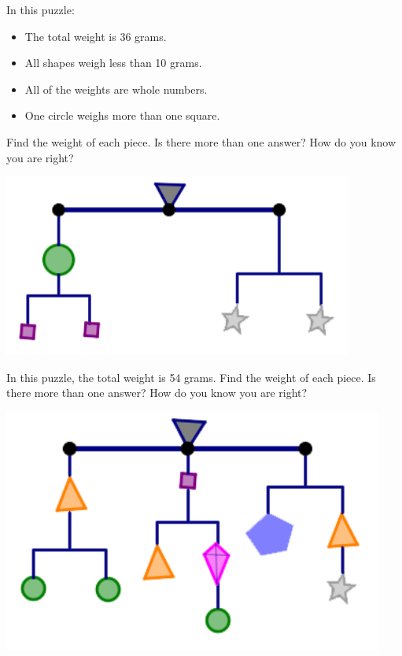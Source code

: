 \begin{problem}\label{prob:mobile1}
In this puzzle:
\begin{itemize}
\item
The total weight is 36 grams. 
\item
 All shapes weigh less than 10 grams.  
 \item
 All of the weights are whole numbers.
 \item
 One circle weighs more than one square.  
 \end{itemize}
 Find the weight of each piece.  Is there more than one answer?  How do you know you are right?

\begin{center}
\includegraphics[height=6cm]{mobile1}
\end{center}
\end{problem}

\newpage

\begin{problem}\label{prob:mobile2}
In this puzzle, the total weight is 54 grams.
 Find the weight of each piece.  Is there more than one answer?  How do you know you are right?
\begin{center}
\includegraphics[height=8cm]{mobile2}
\end{center}
\end{problem}

  
